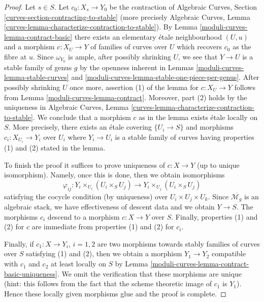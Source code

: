 \begin{proof}
Let $s \in S$. Let $c_0 : X_s \to Y_0$ be the contraction of
Algebraic Curves, Section \ref{curves-section-contracting-to-stable}
(more precisely Algebraic Curves, Lemma
\ref{curves-lemma-characterize-contraction-to-stable}).
By Lemma \ref{moduli-curves-lemma-contract-basic}
there exists an elementary \'etale neighbourhood
$(U, u)$ and a morphism $c : X_U \to Y$
of families of curves over $U$ which recovers
$c_0$ as the fibre at $u$.
Since $\omega_{Y_0}$ is ample, after possibly shrinking $U$,
we see that $Y \to U$ is a stable family of genus $g$
by the openness inherent in
Lemmas \ref{moduli-curves-lemma-stable-curves} and \ref{moduli-curves-lemma-stable-one-piece-per-genus}.
After possibly shrinking $U$ once more, assertion (1) of the lemma for
$c : X_U \to Y$ follows from Lemma \ref{moduli-curves-lemma-contract}.
Moreover, part (2) holds by the uniqueness in Algebraic Curves, Lemma
\ref{curves-lemma-characterize-contraction-to-stable}.
We conclude that a morphism $c$ as in the lemma exists \'etale locally
on $S$. More precisely, there exists an \'etale covering
$\{U_i \to S\}$ and morphisms $c_i : X_{U_i} \to Y_i$ over $U_i$
where $Y_i \to U_i$ is a stable family of curves
having properties (1) and (2) stated in the lemma.

\medskip\noindent
To finish the proof it suffices to prove uniqueness of $c : X \to Y$
(up to unique isomorphism). Namely, once this is done, then we
obtain isomorphisms
$$
\varphi_{ij} :
Y_i \times_{U_i} (U_i \times_S U_j)
\longrightarrow
Y_i \times_{U_j} (U_i \times_S U_j)
$$
satisfying the cocycle condition (by uniqueness) over
$U_i \times U_j \times U_k$. Since $\overline{\mathcal{M}_g}$
is an algebraic stack, we have effectiveness of descent data
and we obtain $Y \to S$. The morphisms $c_i$ descend to a morphism
$c : X \to Y$ over $S$. Finally, properties (1) and (2) for $c$
are immediate from properties (1) and (2) for $c_i$.

\medskip\noindent
Finally, if $c_1 : X \to Y_i$, $i = 1, 2$ are two morphisms towards
stably families of curves over $S$ satisfying (1) and (2), then
we obtain a morphism $Y_1 \to Y_2$ compatible with $c_1$ and $c_2$
at least locally on $S$ by Lemma \ref{moduli-curves-lemma-contract-basic-uniqueness}.
We omit the verification that these morphisms are unique
(hint: this follows from the fact that the scheme theoretic image
of $c_1$ is $Y_1$). Hence these locally given morphisms glue
and the proof is complete.
\end{proof}

